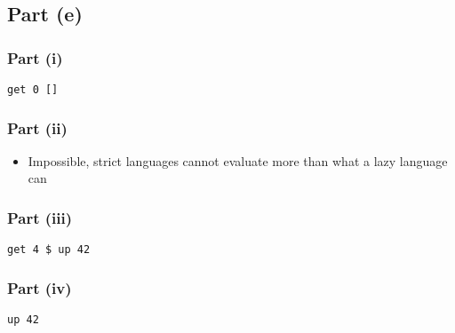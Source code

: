 \documentclass[11pt]{article}
\begin{document}
\subsection{Part (e)}
\label{sec:orgc4c8626}
\subsubsection{Part (i)}
\label{sec:org50498dc}
\begin{verbatim}
get 0 []
\end{verbatim}
\subsubsection{Part (ii)}
\label{sec:org5898961}
\begin{itemize}
\item Impossible, strict languages cannot evaluate more than
what a lazy language can
\end{itemize}
\subsubsection{Part (iii)}
\label{sec:orge2ba261}
\begin{verbatim}
get 4 $ up 42
\end{verbatim}
\subsubsection{Part (iv)}
\label{sec:orgc4bdb3e}
\begin{verbatim}
up 42
\end{verbatim}
\end{document}
